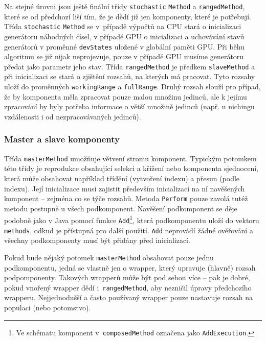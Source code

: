 Na stejné úrovni jsou ještě finální třídy \texttt{stochastic} \texttt{Method} a \texttt{rangedMethod}, které se od předchozí liší tím, že je dědí již jen komponenty, které je potřebují. Třída \texttt{stochastic} \texttt{Method} se v~případě výpočtů na CPU stará o inicializaci generátoru náhodných čísel, v případě GPU o inicializaci a uchovávání stavů generátorů v proměnné \texttt{devStates} uložené v globální paměti GPU. Při běhu algoritmu se již nijak neprojevuje, pouze v případě GPU musíme generátoru předat jako parametr jeho stav. Třída \texttt{rangedMethod} je předkem \texttt{slaveMethod} a při inicializaci se stará o zjištění rozsahů, na kterých má pracovat. Tyto rozsahy uloží do proměnných \texttt{workingRange} a \texttt{fullRange}. Druhý rozsah slouží pro případ, že by komponenta měla zpracovat pouze malou množinu jedinců, ale k jejímu zpracování by byly potřeba informace o větší množině jedinců (např. u nichingu vzdálenosti i od nezpracovávaných jedinců).

\subsubsection{Master a slave komponenty}

Třída \texttt{masterMethod} umožňuje větvení stromu komponent. Typickým potomkem této třídy je reprodukce obsahující selekci a křížení nebo komponenta sjednocení, která může obsahovat například třídění (vytvoření indexu) a přesun (podle indexu). Její inicializace musí zajistit především inicializaci na ní navěšených komponent -- zejména co se týče rozsahů. Metoda \texttt{Perform} pouze zavolá tutéž metodu postupně u všech podkomponent. Navěšení podkomponent se děje podobně jako v Java pomocí funkce \texttt{Add}\footnote{Ve schématu komponent v~\texttt{composedMethod} označena jako \texttt{AddExecution}.}, která podkomponentu uloží do vektoru \texttt{methods}, odkud je přístupná pro další použití. \texttt{Add} neprovádí žádné ověřování a všechny podkomponenty musí být přidány před inicializací.

Pokud bude nějaký potomek \texttt{masterMethod} obsahovat pouze jednu podkomponentu, jedná se vlastně jen o wrapper, který upravuje (hlavně) rozsah podpomponenty. Takových wrapperů může být pod sebou více -- pak je dobré, pokud vnořený wrapper dědí i~\texttt{rangedMethod}, aby nezničil úpravy předchozího wrapperu. Nejjednodušší a často používaný wrapper pouze nastavuje rozsah na populaci (nebo potomstvo).\vspace{0.2cm}

